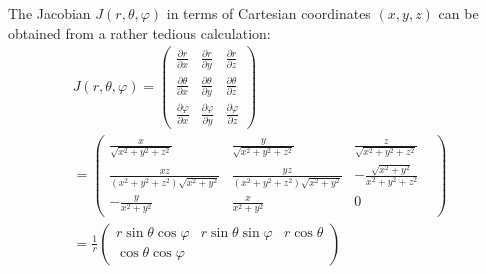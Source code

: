 {The Jacobian $J(r,\theta ,\varphi )$ in terms of Cartesian coordinates $(x,y,z)$
can be obtained from a rather tedious calculation:
\begin{equation}
\begin{split}
J(r,\theta ,\varphi ) =\begin{pmatrix}
\frac{\partial r}{\partial x} &
\frac{\partial r}{\partial y} &
\frac{\partial r}{\partial z} \\
\frac{\partial \theta }{\partial x} &
\frac{\partial \theta }{\partial y} &
\frac{\partial \theta }{\partial z} \\
\frac{\partial \varphi }{\partial x} &
\frac{\partial \varphi }{\partial y} &
\frac{\partial \varphi }{\partial z}
\end{pmatrix}
\\
=
\begin{pmatrix}
\frac{x}{\sqrt{x^2+y^2+z^2}}                           & \frac{y}{\sqrt{x^2+y^2+z^2}}             & \frac{z}{\sqrt{x^2+y^2+z^2}}   \\
\frac{xz}{(x^2+y^2+z^2)\sqrt{x^2+y^2}} &
\frac{yz}{(x^2+y^2+z^2)\sqrt{x^2+y^2}} &
-\frac{\sqrt{x^2+y^2}}{x^2+y^2+z^2} \\
- \frac{y}{ x^2+y^2 } &
 \frac{x}{ x^2+y^2 } &
0 &
\end{pmatrix}
\\
=  \frac{1}{r}
\begin{pmatrix}
  r \sin \theta \cos\varphi  &
 r \sin \theta \sin \varphi  &
 r \cos \theta   \\
\cos \theta \cos \varphi &

\end{pmatrix}
\end{split}
\end{equation}}
